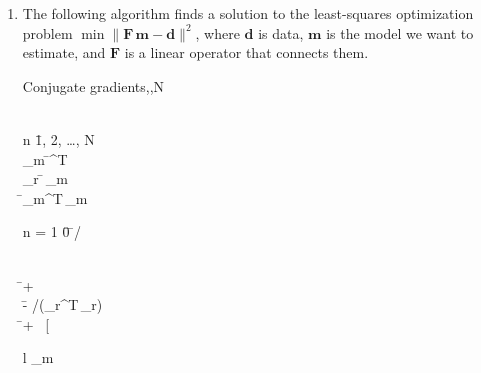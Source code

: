 \begin{enumerate}
\item The following algorithm finds a solution to
  the least-squares optimization problem $\min
  \|\mathbf{F}\,\mathbf{m} - \mathbf{d}\|^2$, where $\mathbf{d}$ is
  data, $\mathbf{m}$ is the model we want to estimate, and
  $\mathbf{F}$ is a linear operator that connects them.

 \begin{algorithm}{Conjugate gradients}{,,N}
   \\
   \\
  \begin{FOR}{n \= 1, 2, \ldots, N} \\
    _m \= ^T\, \\
    _r \= \,_m \\
    \rho \= _m^T\,_m \\
    \begin{IF}{n = 1} 
      \beta \= 0 
      \ELSE 
      \beta \= \rho/\hat{\rho} 
    \end{IF} \\
     \= 
     + \beta\,
     \\
    \alpha \= - \rho/(_r^T\,_r) \\
     \= 
     + \alpha\,
    \left[\begin{array}{l}
        _m \\

\end{array}
\end{FOR}
\end{algorithm}
\end{enumerate}
